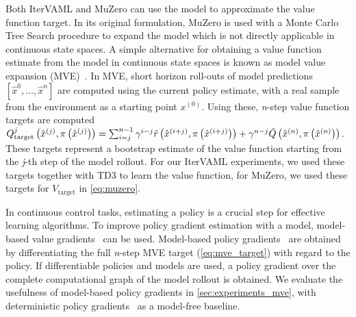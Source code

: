 Both IterVAML and MuZero can use the model to approximate the value function target. 
In its original formulation, MuZero is used with a Monte Carlo Tree Search procedure to expand the model which is not directly applicable in continuous state spaces.
A simple alternative for obtaining a value function estimate from the model in continuous state spaces is known as model value expansion (MVE)~\parencite{feinberg2018model}.
In MVE, short horizon roll-outs of model predictions $[{\hat{x}^{0},\dots,\hat{x}^{n}}]$ are computed using the current policy estimate, with a real sample from the environment as a starting point $x^{(0)}$.
Using these, \textit{n}-step value function targets are computed
    $Q_\text{target}^j\left( \hat{x}^{(j)},\pi\left( \hat{x}^{(j)} \right) \right) = \sum_{i=j}^{n-1} \gamma^{i-j} \hat{r}\left( \hat{x}^{(i+j)}, \pi\left( \hat{x}^{(i+j)} \right) \right) + \gamma^{n-j} \bar{Q}\left(\hat{x}^{(n)}, \pi\left( \hat{x}^{(n)} \right)\right) \label{eq:mve_target}$.
These targets represent a bootstrap estimate of the value function starting from the \textit{j}-th step of the model rollout.
For our IterVAML experiments, we used these targets together with TD3 \parencite{td3} to learn the value function, for MuZero, we used these targets for $V_\text{target}$ in \autoref{eq:muzero}.



In continuous control tasks, estimating a policy is a crucial step for effective learning algorithms.
To improve policy gradient estimation with a model, model-based value gradients~\parencite{heess2015learning,amos2021model} can be used.
Model-based policy gradients~\parencite{heess2015learning} are obtained by differentiating the full \textit{n}-step MVE target (\autoref{eq:mve_target}) with regard to the policy.
If differentiable policies and models are used, a policy gradient over the complete computational graph of the model rollout is obtained.
We evaluate the usefulness of model-based policy gradients in \autoref{sec:experiments_mve}, with deterministic policy gradients~\parencite{silver2014deterministic,ddpg} as a model-free baseline.

